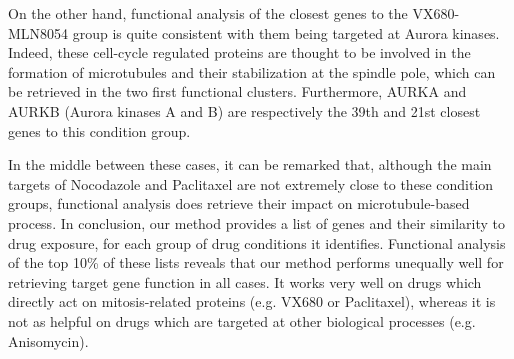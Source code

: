 On the other hand, functional analysis of the closest genes to the
VX680-MLN8054 group is quite consistent with them being targeted at
Aurora kinases. Indeed, these cell-cycle regulated proteins are
thought to be involved in the formation of microtubules and their
stabilization at the spindle pole, which can be retrieved in the two
first functional clusters. Furthermore, AURKA and AURKB (Aurora
kinases A and B) are respectively the 39th and 21st closest genes to
this condition group. 

In the middle between these cases, it can be remarked that, although the main targets of Nocodazole and Paclitaxel are not extremely close to these condition groups, functional analysis does retrieve their impact on microtubule-based process. In conclusion, our method provides a list of genes and their similarity to drug exposure, for each group of drug conditions it identifies. Functional analysis of the top 10\% of these lists reveals that our method performs unequally well for retrieving target gene function in all cases. It works very well on drugs which directly act on mitosis-related proteins (e.g. VX680 or Paclitaxel), whereas it is not as helpful on drugs which are targeted at other biological processes (e.g. Anisomycin). 


